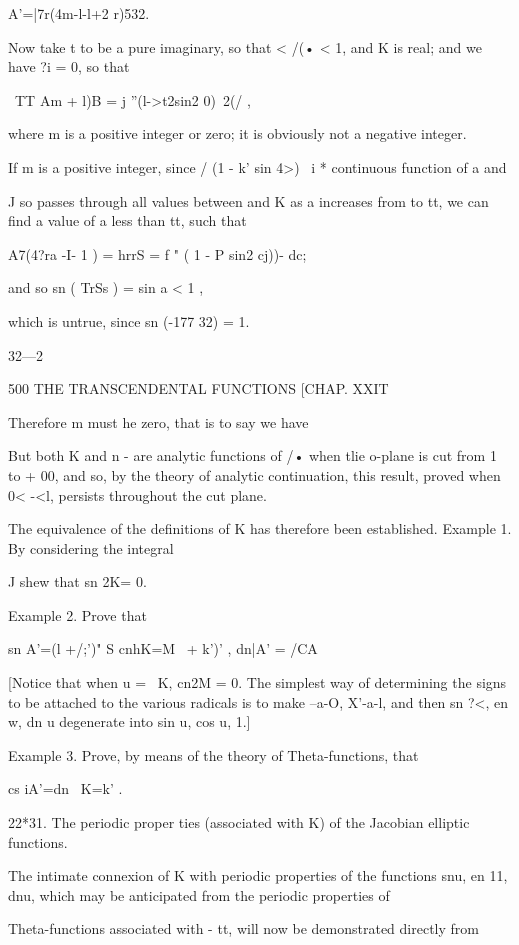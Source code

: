 A'=|7r(4m-l-l+2 r)532.

Now take t to be a pure imaginary, so that < /(• < 1, and K is real;
and we have ?i = 0, so that

\ TT Am + l)B = j ''(l->t2sin2 0)~2(/ ,

where m is a positive integer or zero; it is obviously not a negative
integer.

If m is a positive integer, since / (1 - k' sin 4>)~ i * continuous
function of a and

J so passes through all values between and K as a increases from to
tt, we can find a value of a less than tt, such that

A7(4?ra -I- 1 ) = hrrS = f " ( 1 - P sin2 cj))- dc;

and so sn ( TrSs ) = sin a < 1 ,

which is untrue, since sn (-177 32) = 1.

32—2

500 THE TRANSCENDENTAL FUNCTIONS [CHAP. XXIT

Therefore m must he zero, that is to say we have

But both K and n - are analytic functions of /• when tlie o-plane is
cut from 1 to + 00, and so, by the theory of analytic continuation,
this result, proved when 0< -<l, persists throughout the cut plane.

The equivalence of the definitions of K has therefore been
established. Example 1. By considering the integral

J shew that sn 2K= 0.

Example 2. Prove that

sn A'=(l +/;')" S cnhK=M \ + k')' , dn|A' = /CA

[Notice that when u = \ K, cn2M = 0. The simplest way of determining
the signs to be attached to the various radicals is to make --a-O,
X'-a-l, and then sn ?<, en w, dn u degenerate into sin u, cos u, 1.]

Example 3. Prove, by means of the theory of Theta-functions, that

cs iA'=dn \ K=k' .

22*31. The periodic proper ties (associated with K) of the Jacobian
elliptic functions.

The intimate connexion of K with periodic properties of the functions
snu, en 11, dnu, which may be anticipated from the periodic properties
of

Theta-functions associated with - tt, will now be demonstrated
directly from

